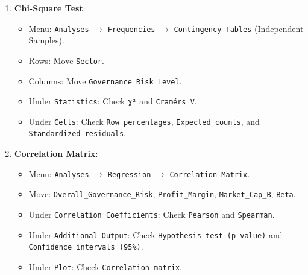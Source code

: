 \documentclass[
]{article}
\providecommand{\tightlist}{%
  \setlength{\itemsep}{0pt}\setlength{\parskip}{0pt}}
\begin{document}
\begin{enumerate}
\def\labelenumi{\arabic{enumi}.}
\tightlist
\item
  \textbf{Chi-Square Test}:

  \begin{itemize}
  \tightlist
  \item
    Menu: \texttt{Analyses} \(\rightarrow\) \texttt{Frequencies}
    \(\rightarrow\) \texttt{Contingency\ Tables} (Independent Samples).
  \item
    Rows: Move \texttt{Sector}.
  \item
    Columns: Move \texttt{Governance\_Risk\_Level}.
  \item
    Under \texttt{Statistics}: Check \texttt{χ²} and
    \texttt{Cramér\textquotesingle{}s\ V}.
  \item
    Under \texttt{Cells}: Check \texttt{Row\ percentages},
    \texttt{Expected\ counts}, and \texttt{Standardized\ residuals}.
  \end{itemize}
\item
  \textbf{Correlation Matrix}:

  \begin{itemize}
  \tightlist
  \item
    Menu: \texttt{Analyses} \(\rightarrow\) \texttt{Regression}
    \(\rightarrow\) \texttt{Correlation\ Matrix}.
  \item
    Move: \texttt{Overall\_Governance\_Risk}, \texttt{Profit\_Margin},
    \texttt{Market\_Cap\_B}, \texttt{Beta}.
  \item
    Under \texttt{Correlation\ Coefficients}: Check \texttt{Pearson} and
    \texttt{Spearman}.
  \item
    Under \texttt{Additional\ Output}: Check
    \texttt{Hypothesis\ test\ (p-value)} and
    \texttt{Confidence\ intervals\ (95\%)}.
  \item
    Under \texttt{Plot}: Check \texttt{Correlation\ matrix}.
  \end{itemize}
\end{enumerate}
\end{document}
